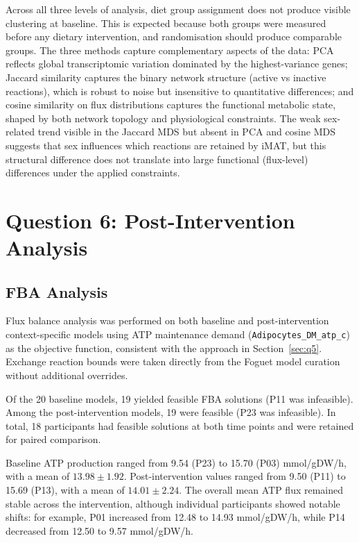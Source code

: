 \documentclass[11pt, a4paper]{article}
\newcommand{\rxn}[1]{\texttt{#1}}          %
\begin{document}
Across all three levels of analysis, diet group assignment does not produce visible clustering at baseline. This is expected because both groups were measured before any dietary intervention, and randomisation should produce comparable groups. The three methods capture complementary aspects of the data: PCA reflects global transcriptomic variation dominated by the highest-variance genes; Jaccard similarity captures the binary network structure (active vs inactive reactions), which is robust to noise but insensitive to quantitative differences; and cosine similarity on flux distributions captures the functional metabolic state, shaped by both network topology and physiological constraints. The weak sex-related trend visible in the Jaccard MDS but absent in PCA and cosine MDS suggests that sex influences which reactions are retained by iMAT, but this structural difference does not translate into large functional (flux-level) differences under the applied constraints.


\section{Question 6: Post-Intervention Analysis}
\label{sec:q6}

\subsection{FBA Analysis}%

Flux balance analysis was performed on both baseline and post-intervention context-specific models using ATP maintenance demand (\rxn{Adipocytes\_DM\_atp\_c}) as the objective function, consistent with the approach in Section~\ref{sec:q5}. Exchange reaction bounds were taken directly from the Foguet model curation without additional overrides.

Of the 20 baseline models, 19 yielded feasible FBA solutions (P11 was infeasible). Among the post-intervention models, 19 were feasible (P23 was infeasible). In total, 18 participants had feasible solutions at both time points and were retained for paired comparison.

Baseline ATP production ranged from 9.54 (P23) to 15.70 (P03) mmol/gDW/h, with a mean of $13.98 \pm 1.92$. Post-intervention values ranged from 9.50 (P11) to 15.69 (P13), with a mean of $14.01 \pm 2.24$. The overall mean ATP flux remained stable across the intervention, although individual participants showed notable shifts: for example, P01 increased from 12.48 to 14.93 mmol/gDW/h, while P14 decreased from 12.50 to 9.57 mmol/gDW/h.
\end{document}
